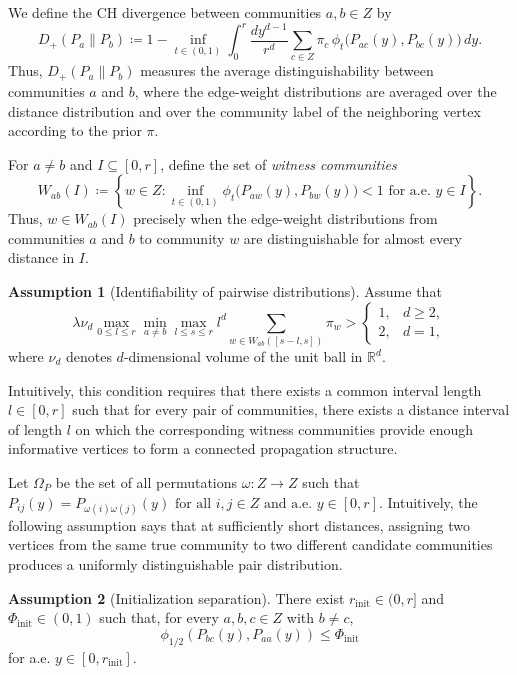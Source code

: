 \documentclass[11pt, a4paper]{amsart}
\newcommand{\1}{\mathbf{1}}
\theoremstyle{definition}
\theoremstyle{remark}
\theoremstyle{definition}
\newtheorem{assumption}{Assumption}
\begin{document}
We define the CH divergence between communities $a,b\in Z$ by
\begin{equation}
\label{eq:def_CH}
D_+(P_a\|P_b)
\coloneqq
1-
\inf_{t\in(0,1)}
\int_0^r
\frac{d y^{d-1}}{r^d}
\sum_{c\in Z}\pi_c\,
\phi_t\bigl(P_{ac}(y),P_{bc}(y)\bigr)
\,dy.
\end{equation}
Thus, $D_+(P_a\|P_b)$ measures the average distinguishability between
communities $a$ and $b$, where the edge-weight distributions are
averaged over the distance distribution and over the community label
of the neighboring vertex according to the prior $\pi$.

For $a\neq b$ and $I\subseteq[0,r]$, define the set of
\textit{witness communities}
\[
W_{ab}(I)
\coloneqq
\left\{
w\in Z:
\inf_{t\in(0,1)}
\phi_t\bigl(P_{aw}(y),P_{bw}(y)\bigr)<1
\text{ for a.e. }y\in I
\right\}.
\]
Thus, $w\in W_{ab}(I)$ precisely when the edge-weight distributions
from communities $a$ and $b$ to community $w$ are distinguishable for
almost every distance in $I$.

\begin{assumption}[Identifiability of pairwise distributions]
\label{ass:identifiability}Assume that 
\begin{equation}
\label{eq: conn constraint}
\lambda \nu_d \max_{0 \le l \le r }\min_{a \neq b}\max_{l \leq s \leq r} 
l^d \sum_{w \in W_{ab}([s-l, s])} \pi_w
>
\begin{cases}
1, & d \ge 2, \\
2, & d = 1,
\end{cases}
\end{equation}
where $\nu_d$ denotes $d$-dimensional volume of the unit ball in $\mathbb R^d$.

Intuitively, this condition requires that there exists a common interval length $l \in [0,r]$ such that for every pair of communities, there exists a distance interval of length $l$ on which the corresponding witness communities provide enough informative vertices to form a connected propagation structure.
\end{assumption}

Let $\Omega_P$ be the set of all permutations $\omega:Z\to Z $ such that $P_{ij}(y)=P_{\omega(i)\omega(j)}(y)
\text{ for all }i,j\in Z
\text{ and a.e. }y\in[0,r]$.
Intuitively, the following assumption says that at sufficiently short distances, assigning two vertices from the same true community to two different candidate communities produces a uniformly distinguishable pair distribution.
\begin{assumption}[Initialization separation]
\label{ass:init-identifiability}
There exist $r_{\mathrm{init}}\in(0,r]$ and
$\Phi_{\mathrm{init}}\in(0,1)$ such that, for every
$a,b,c\in Z$ with $b\neq c$,
\[
\phi_{1/2}\left(
P_{bc}(y),P_{aa}(y)
\right)
\leq
\Phi_{\mathrm{init}}
\]
for a.e. $y\in[0,r_{\mathrm{init}}]$.
\end{assumption}
\end{document}
